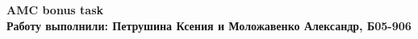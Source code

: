 \documentclass[a4paper, 14pt]{article}
\numberwithin{equation}{section}
\begin{document}
\begin{center}
    \textbf{AMC bonus task}\\
    \textbf{Работу выполнили: Петрушина Ксения и Моложавенко Александр, Б05-906 }
\end{center}
\end{document}
